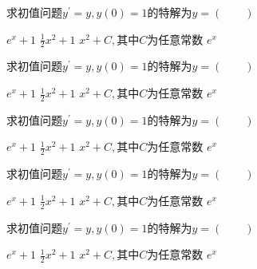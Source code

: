 \documentclass[twoside,12pt]{hnuexam}
\begin{document}
\begin{questions}
	\question
	求初值问题$y^\prime=y,y(0)=1$的特解为$y=$\hfill $(\qquad)$

	\begin{oneparchoices}
		\choice $e^x+1$
		\choice	$\frac{1}{2}x^2+1$
		\choice $x^2+C,\text{其中}C$为任意常数
		\CorrectChoice $e^x$
	\end{oneparchoices}

	\question
		求初值问题$y^\prime=y,y(0)=1$的特解为$y=$\hfill $(\qquad)$
	
		\begin{oneparchoices}
			\choice $e^x+1$
			\choice	$\frac{1}{2}x^2+1$
			\choice $x^2+C,\text{其中}C$为任意常数
			\CorrectChoice $e^x$
		\end{oneparchoices}

\question
	求初值问题$y^\prime=y,y(0)=1$的特解为$y=$\hfill $(\qquad)$

	\begin{oneparchoices}
		\choice $e^x+1$
		\choice	$\frac{1}{2}x^2+1$
		\choice $x^2+C,\text{其中}C$为任意常数
		\CorrectChoice $e^x$
	\end{oneparchoices}


\question
	求初值问题$y^\prime=y,y(0)=1$的特解为$y=$\hfill $(\qquad)$

	\begin{oneparchoices}
		\choice $e^x+1$
		\choice	$\frac{1}{2}x^2+1$
		\choice $x^2+C,\text{其中}C$为任意常数
		\CorrectChoice $e^x$
	\end{oneparchoices}


	\question
		求初值问题$y^\prime=y,y(0)=1$的特解为$y=$\hfill $(\qquad)$
	
		\begin{oneparchoices}
			\choice $e^x+1$
			\choice	$\frac{1}{2}x^2+1$
			\choice $x^2+C,\text{其中}C$为任意常数
			\CorrectChoice $e^x$
		\end{oneparchoices}


\end{questions}
\end{document}

